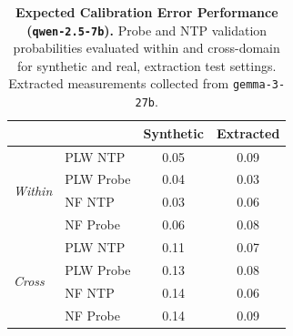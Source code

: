 \begin{table}[ht]
\centering
\begin{tabular}{ll cc}
\toprule
& & Synthetic & Extracted \\
\midrule
\multirow{4}{*}{\textit{Within}}
& PLW NTP & 0.05 & 0.09 \\
& PLW Probe & 0.04 & 0.03 \\
& NF NTP & 0.03 & 0.06 \\
& NF Probe & 0.06 & 0.08 \\
\midrule
\multirow{4}{*}{\textit{Cross}}
& PLW NTP & 0.11 & 0.07 \\
& PLW Probe & 0.13 & 0.08 \\
& NF NTP & 0.14 & 0.06 \\
& NF Probe & 0.14 & 0.09 \\
\bottomrule
\end{tabular}
\caption{\textbf{Expected Calibration Error Performance (\texttt{qwen-2.5-7b}).} Probe and NTP validation probabilities evaluated within and cross-domain for synthetic and real, extraction test settings. Extracted measurements collected from \texttt{gemma-3-27b}.}
\label{tab:qwen-2.5-7b-gemma-3-27b}
\end{table}
